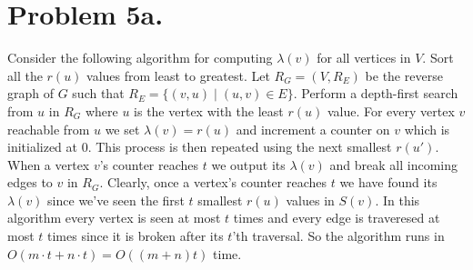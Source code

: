 \documentclass[12pt]{article}
\begin{document}
\section*{Problem 5a.}
Consider the following algorithm for computing $\lambda(v)$ for all vertices in
$V$. Sort all the $r(u)$ values from least to greatest. Let $R_G = (V, R_E)$ be
the reverse graph of $G$ such that $R_E = \{(v,u) \mid (u,v) \in E \}$. Perform
a depth-first search from $u$ in $R_G$ where $u$ is the vertex with the least
$r(u)$ value. For every vertex $v$ reachable from $u$ we set $\lambda(v) = r(u)$
and increment a counter on $v$ which is initialized at $0$. This process is then
repeated using the next smallest $r(u')$. When a vertex $v$'s counter reaches
$t$ we output its $\lambda(v)$ and break all incoming edges to $v$ in $R_G$.
Clearly, once a vertex's counter reaches $t$ we have found its $\lambda(v)$
since we've seen the first $t$ smallest $r(u)$ values in $S(v)$. In this
algorithm every vertex is seen at most $t$ times and every edge is traveresed at
most $t$ times since it is broken after its $t$'th traversal. So the algorithm
runs in $O(m\cdot t + n\cdot t) = O((m +n)t)$ time.
\end{document}
